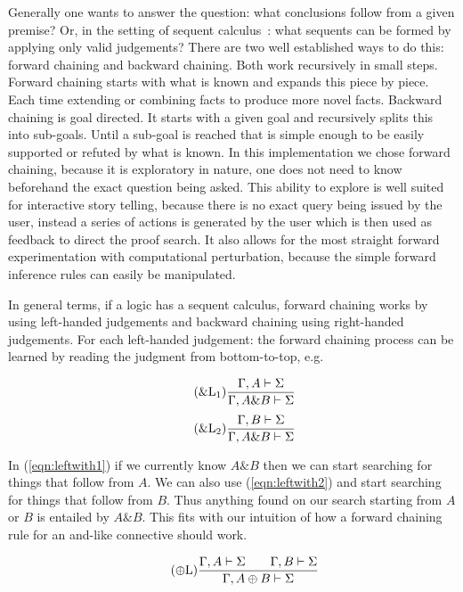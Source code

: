 \documentclass[]{article}
\newcommand{\refp}[1]{(\ref{#1})}
\begin{document}
Generally one wants to answer the question: what conclusions follow from a
given premise? Or, in the setting of sequent calculus~\cite{girard1989proofs}:
what sequents can be formed by applying only valid judgements? There are two
well established ways to do this: forward chaining and backward chaining. Both
work recursively in small steps. Forward chaining starts with what is known
and expands this piece by piece. Each time extending or combining facts to
produce more novel facts. Backward chaining is goal directed. It starts with a
given goal and recursively splits this into sub-goals. Until a sub-goal is
reached that is simple enough to be easily supported or refuted by what is
known. In this implementation we chose forward chaining, because it is
exploratory in nature, one does not need to know beforehand the exact question
being asked. This ability to explore is well suited for interactive story
telling, because there is no exact query being issued by the user, instead a
series of actions is generated by the user which is then used as feedback to
direct the proof search. It also allows for the most straight forward
experimentation with computational perturbation, because the simple forward
inference rules can easily be manipulated.

In general terms, if a logic has a sequent calculus, forward chaining works by
using left-handed judgements and backward chaining using right-handed
judgements. For each left-handed judgement: the forward chaining process can
be learned by reading the judgment from bottom-to-top, e.g.

\begin{equation}\label{eqn:leftwith1}\tag{$\&\text{L}_1$}
    \frac{\Gamma, A \vdash \Sigma}{\Gamma, A \& B \vdash \Sigma}
\end{equation}
\begin{equation}\label{eqn:leftwith2}\tag{$\&\text{L}_2$}
    \frac{\Gamma, B \vdash \Sigma}{\Gamma, A \& B \vdash \Sigma}
\end{equation}

In \refp{eqn:leftwith1} if we currently know $A\&B$
then we can start searching for things that follow from $A$. We can also use
\refp{eqn:leftwith2} and start searching for things that follow from $B$. Thus
anything found on our search starting from $A$ or $B$ is entailed by $A\&B$.
This fits with our intuition of how a forward chaining rule for an and-like
connective should work.

\begin{equation}\label{eqn:leftPlus}\tag{$\oplus\text{L}$}
    \frac{\Gamma, A \vdash \Sigma   \qquad   \Gamma, B \vdash \Sigma}
         {\Gamma, A \oplus B \vdash \Sigma}
\end{equation}
\end{document}
